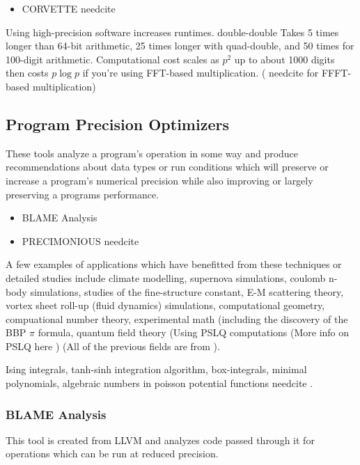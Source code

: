 \documentclass[american]{article}
\newcommand{\needcite}{
	\gls{needcite}
}
\begin{document}
\begin{itemize}
\item CORVETTE \needcite
\end{itemize}

Using high-precision software increases runtimes. double-double Takes 5 times longer than 64-bit arithmetic, 25 times longer with quad-double, and 50 times for 100-digit arithmetic. Computational cost scales as $p^2$ up to about 1000 digits then costs $p\log p$ if you're using FFT-based multiplication. \cite{high-precision-arith-in-science} (\needcite for FFFT-based multiplication)

\subsection{Program Precision Optimizers}

These tools analyze a program's operation in some way and produce recommendations about data types or run conditions which will preserve or increase a program's numerical precision while also improving or largely preserving a programs performance.

\begin{itemize}
\item BLAME Analysis \cite{blame-analysis}
\item PRECIMONIOUS \needcite
\end{itemize}

A few examples of applications which have benefitted from these techniques or detailed studies include climate modelling, supernova simulations, coulomb n-body simulations, studies of the fine-structure constant, E-M scattering theory, vortex sheet roll-up (fluid dynamics) simulations, computational geometry, compuational number theory, experimental math (including the discovery of the BBP $\pi$ formula, quantum field theory (Using PSLQ computations (More info on PSLQ here \cite{dhb-numerical-bugs}) (All of the previous fields are from \cite{high-precision-arith-in-science}).

Ising integrals, tanh-sinh integration algorithm, box-integrals, minimal polynomials, algebraic numbers in poisson potential functions \needcite \cite{dhb-zurich-hp}.

\subsubsection{BLAME Analysis}

This tool is created from LLVM and analyzes code passed through it for operations which can be run at reduced precision. \cite{blame-analysis}
\end{document}
